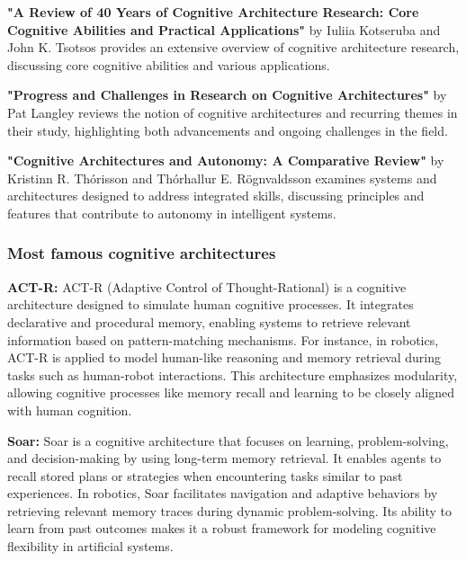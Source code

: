             \textbf{"A Review of 40 Years of Cognitive Architecture Research: Core Cognitive Abilities and Practical Applications"} by Iuliia Kotseruba and John K. Tsotsos provides an extensive overview of cognitive architecture research, discussing core cognitive abilities and various applications. \cite{kotseruba-2016-review-40-years-cognitive-architecture}
            
            \textbf{"Progress and Challenges in Research on Cognitive Architectures"} by Pat Langley reviews the notion of cognitive architectures and recurring themes in their study, highlighting both advancements and ongoing challenges in the field. \cite{langley-2017-progress-challenges-cognitive-architectures}
            
            \textbf{"Cognitive Architectures and Autonomy: A Comparative Review"} by Kristinn R. Thórisson and Thórhallur E. Rögnvaldsson examines systems and architectures designed to address integrated skills, discussing principles and features that contribute to autonomy in intelligent systems. \cite{thorisson-2012-cognitive-architectures-autonomy}

            
    
        \subsubsection{Most famous cognitive architectures}
            \textbf{ACT-R:} ACT-R (Adaptive Control of Thought-Rational) is a cognitive architecture designed to simulate human cognitive processes. It integrates declarative and procedural memory, enabling systems to retrieve relevant information based on pattern-matching mechanisms. For instance, in robotics, ACT-R is applied to model human-like reasoning and memory retrieval during tasks such as human-robot interactions. This architecture emphasizes modularity, allowing cognitive processes like memory recall and learning to be closely aligned with human cognition. \cite{anderson-1996-act-r}
            
            \textbf{Soar:} Soar is a cognitive architecture that focuses on learning, problem-solving, and decision-making by using long-term memory retrieval. It enables agents to recall stored plans or strategies when encountering tasks similar to past experiences. In robotics, Soar facilitates navigation and adaptive behaviors by retrieving relevant memory traces during dynamic problem-solving. Its ability to learn from past outcomes makes it a robust framework for modeling cognitive flexibility in artificial systems. \cite{lehman-1996-soar-architecture}
            
